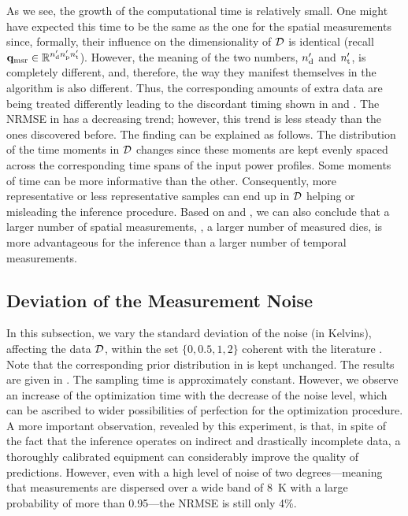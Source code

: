 As we see, the growth of the computational time is relatively small. One might have expected this time to be the same as the one for the spatial measurements since, formally, their influence on the dimensionality of $\mathcal{D}$ is identical (recall $\mathbf{q}_{\text{msr}} \in \mathbb{R}^{{n_\text{d}'} {n_\text{p}'} {n_\text{t}'}}$). However, the meaning of the two numbers, ${n_\text{d}'}$ and ${n_\text{t}'}$, is completely different, and, therefore, the way they manifest themselves in the algorithm is also different. Thus, the corresponding amounts of extra data are being treated differently leading to the discordant timing shown in  and .
The NRMSE in  has a decreasing trend; however, this trend is less steady than the ones discovered before. The finding can be explained as follows. The distribution of the time moments in $\mathcal{D}$ changes since these moments are kept evenly spaced across the corresponding time spans of the input power profiles. Some moments of time can be more informative than the other. Consequently, more representative or less representative samples can end up in $\mathcal{D}$ helping or misleading the inference procedure.
Based on  and , we can also conclude that a larger number of spatial measurements, \ie, a larger number of measured dies, is more advantageous for the inference than a larger number of temporal measurements.

\subsection{Deviation of the Measurement Noise}
In this subsection, we vary the standard deviation of the noise (in Kelvins), affecting the data $\mathcal{D}$, within the set $\{ 0, 0.5, 1, 2 \}$ coherent with the literature \cite{mesa-martinez2007}. Note that the corresponding prior distribution in  is kept unchanged. The results are given in .
The sampling time is approximately constant. However, we observe an increase of the optimization time with the decrease of the noise level, which can be ascribed to wider possibilities of perfection for the optimization procedure.
A more important observation, revealed by this experiment, is that, in spite of the fact that the inference operates on indirect and drastically incomplete data, a thoroughly calibrated equipment can considerably improve the quality of predictions.
However, even with a high level of noise of two degrees---meaning that measurements are dispersed over a wide band of 8~K with a large probability of more than 0.95---the NRMSE is still only 4\%.

